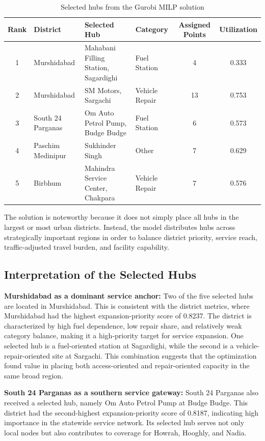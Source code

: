\begin{table}[h!]
\centering
\caption{Selected hubs from the Gurobi MILP solution}
\label{tab:gurobi_selected_hubs}
\begin{tabular}{|c|l|p{5.2cm}|l|c|c|}
\hline
\textbf{Rank} & \textbf{District} & \textbf{Selected Hub} & \textbf{Category} & \textbf{Assigned Points} & \textbf{Utilization} \\
\hline
1 & Murshidabad & Mahabani Filling Station, Sagardighi & Fuel Station & 4 & 0.333 \\
2 & Murshidabad & SM Motors, Sargachi & Vehicle Repair & 13 & 0.753 \\
3 & South 24 Parganas & Om Auto Petrol Pump, Budge Budge & Fuel Station & 6 & 0.573 \\
4 & Paschim Medinipur & Sukhinder Singh & Other & 7 & 0.629 \\
5 & Birbhum & Mahindra Service Center, Chakpara & Vehicle Repair & 7 & 0.576 \\
\hline
\end{tabular}
\end{table}

The solution is noteworthy because it does not simply place all hubs in the largest or most urban districts. Instead, the model distributes hubs across strategically important regions in order to balance district priority, service reach, traffic-adjusted travel burden, and facility capability.

\subsection{Interpretation of the Selected Hubs}

\textbf{Murshidabad as a dominant service anchor:} Two of the five selected hubs are located in Murshidabad. This is consistent with the district metrics, where Murshidabad had the highest expansion-priority score of 0.8237. The district is characterized by high fuel dependence, low repair share, and relatively weak category balance, making it a high-priority target for service expansion. One selected hub is a fuel-oriented station at Sagardighi, while the second is a vehicle-repair-oriented site at Sargachi. This combination suggests that the optimization found value in placing both access-oriented and repair-oriented capacity in the same broad region.

\textbf{South 24 Parganas as a southern service gateway:} South 24 Parganas also received a selected hub, namely Om Auto Petrol Pump at Budge Budge. This district had the second-highest expansion-priority score of 0.8187, indicating high importance in the statewide service network. Its selected hub serves not only local nodes but also contributes to coverage for Howrah, Hooghly, and Nadia.

